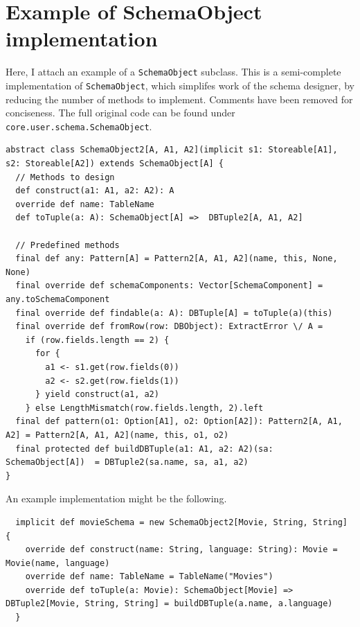 \documentclass[12pt,a4paper,twoside,openright]{report}
\newcommand\codeName[1]{\texttt{#1}}
\renewcommand{\baselinestretch}{1.1}    %
\begin{document}
\chapter{Example of SchemaObject implementation}
\label{SchemaObjectDemo}
Here, I attach an example of a \codeName{SchemaObject} subclass. This is a semi-complete implementation of \codeName{SchemaObject}, which simplifes work of the schema designer, by reducing the number of methods to implement. Comments have been removed for conciseness. The full original code can be found under \codeName{core.user.schema.SchemaObject}.

\renewcommand{\baselinestretch}{0.8}
\begin{framed}
\begin{verbatim}
abstract class SchemaObject2[A, A1, A2](implicit s1: Storeable[A1], s2: Storeable[A2]) extends SchemaObject[A] {
  // Methods to design
  def construct(a1: A1, a2: A2): A
  override def name: TableName
  def toTuple(a: A): SchemaObject[A] =>  DBTuple2[A, A1, A2]

  // Predefined methods
  final def any: Pattern[A] = Pattern2[A, A1, A2](name, this, None, None)
  final override def schemaComponents: Vector[SchemaComponent] = any.toSchemaComponent
  final override def findable(a: A): DBTuple[A] = toTuple(a)(this)
  final override def fromRow(row: DBObject): ExtractError \/ A =
    if (row.fields.length == 2) {
      for {
        a1 <- s1.get(row.fields(0))
        a2 <- s2.get(row.fields(1))
      } yield construct(a1, a2)
    } else LengthMismatch(row.fields.length, 2).left
  final def pattern(o1: Option[A1], o2: Option[A2]): Pattern2[A, A1, A2] = Pattern2[A, A1, A2](name, this, o1, o2)
  final protected def buildDBTuple(a1: A1, a2: A2)(sa: SchemaObject[A])  = DBTuple2(sa.name, sa, a1, a2)
}
\end{verbatim}
\end{framed}
\renewcommand{\baselinestretch}{1.1}
An example implementation might be the following.

\renewcommand{\baselinestretch}{0.8}
\begin{framed}
\begin{verbatim}
  implicit def movieSchema = new SchemaObject2[Movie, String, String] {
    override def construct(name: String, language: String): Movie = Movie(name, language)
    override def name: TableName = TableName("Movies")
    override def toTuple(a: Movie): SchemaObject[Movie] => DBTuple2[Movie, String, String] = buildDBTuple(a.name, a.language)
  }
\end{verbatim}
\end{framed}
\renewcommand{\baselinestretch}{1.1}
\end{document}

